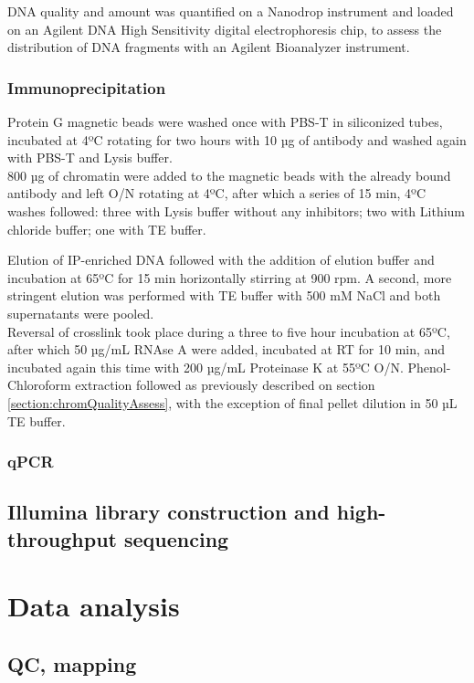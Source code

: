 \documentclass[11pt,twoside,a4paper]{report}
\begin{document}
			DNA quality and amount was quantified on a Nanodrop instrument and loaded on an Agilent DNA High Sensitivity digital electrophoresis chip, to assess the distribution of DNA fragments with an Agilent Bioanalyzer instrument.
			
			\subsubsection{Immunoprecipitation}
			Protein G magnetic beads were washed once with PBS-T in siliconized tubes, incubated at 4ºC rotating for two hours with 10 µg of antibody and washed again with PBS-T and Lysis buffer. \\
			
			800 µg of chromatin were added to the magnetic beads with the already bound antibody and left O/N rotating at 4ºC, after which a series of 15 min, 4ºC washes followed: three with Lysis buffer without any inhibitors; two with Lithium chloride buffer; one with TE buffer.
			
			Elution of IP-enriched DNA followed with the addition of elution buffer and incubation at 65ºC for 15 min horizontally stirring at 900 rpm. A second, more stringent elution was performed with TE buffer with 500 mM NaCl and both supernatants were pooled. \\
			
			Reversal of crosslink took place during a three to five hour incubation at 65ºC, after which 50 µg/mL RNAse A were added, incubated at RT for 10 min, and incubated again this time with 200 µg/mL Proteinase K at 55ºC O/N. Phenol-Chloroform extraction followed as previously described on section \ref{section:chromQualityAssess}, with the exception of final pellet dilution in 50 µL TE buffer.
			\subsubsection{qPCR}
		
		
		\subsection{Illumina library construction and high-throughput sequencing}
		
	\section{Data analysis}
		\subsection{QC, mapping}
\end{document}
